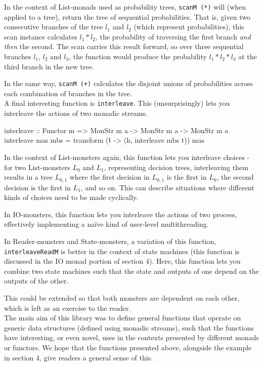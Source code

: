 In the context of List-monads used as probability trees, \verb+scanM (*)+ will (when applied to a tree), return the tree of sequential probabilities. That is, given two consecutive branches of the tree $l_1$ and $l_2$ (which represent probabilities), this scan instance calculates $l_1 * l_2$, the probability of traversing the first branch \emph{and then} the second. The scan carries this result forward, so over three sequential branches $l_1$, $l_2$ and $l_3$, the function would produce the probability $l_1 * l_2 * l_3$ at the third branch in the new tree. 

In the same way, \verb=scanM (+)= calculates the disjoint unions of probabilities across each combination of branches in the tree. \\

A final interesting function is \verb+interleave+. This (unsurprisingly) lets you interleave the actions of two monadic streams.

\begin{haskell}
interleave :: Functor m =>  MonStr m a -> MonStr m a -> MonStr m a
interleave mas mbs = transform (\h t -> (h, interleave mbs t)) mas
\end{haskell}

In the context of List-monsters again, this function lets you interleave choices - for two List-monsters $L_0$ and $L_1$, representing decision trees, interleaving them results in a tree $L_{0,1}$ where the first decision in $L_{0,1}$ is the first in $L_0$, the second decision is the first in $L_1$, and so on. This can describe situations where different kinds of choices need to be made cyclically. 

In IO-monsters, this function lets you interleave the actions of two process, effectively implementing a naïve kind of user-level multithreading.

In Reader-monsters and State-monsters, a variation of this function, \newline \verb+interleaveReadM+ is better in the context of state machines (this function is discussed in the IO monad portion of section 4). Here, this function lets you combine two state machines such that the state and outputs of one depend on the outputs of the other. 
This could be extended so that both monsters are dependent on each other, which is left as an exercise to the reader. \\

The main aim of this library was to define general functions that operate on generic data structures (defined using monadic streams), such that the functions have interesting, or even novel, uses in the contexts presented by different monads or functors. We hope that the functions presented above, alongside the example in section 4, give readers a general sense of this.
